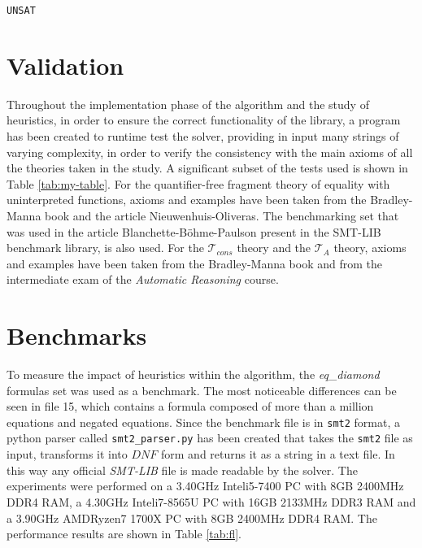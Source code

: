 \documentclass{IEEEtran}
\begin{document}
\begin{lstlisting}
UNSAT
\end{lstlisting}

\section{Validation}
Throughout the implementation phase of the algorithm and the study of heuristics, in order to ensure the correct functionality of the library, a program has been created to runtime test the solver, providing in input many strings of varying complexity, in order to verify the consistency with the main axioms of all the theories taken in the study. A significant subset of the tests used is shown in Table \ref{tab:my-table}. For the quantifier-free fragment theory of equality with uninterpreted functions, axioms and examples have been taken from the Bradley-Manna book\cite{10.5555/1324777} and the article Nieuwenhuis-Oliveras\cite{NIEUWENHUIS2007557}. The benchmarking set that was used in the article Blanchette-B\"{o}hme-Paulson\cite{Blanchette2013} present in the SMT-LIB benchmark library\cite{Z3}, is also used. For the $\mathcal{T}_{cons}$ theory and the $\mathcal{T}_{A}$ theory, axioms and examples have been taken from the Bradley-Manna book\cite{10.5555/1324777} and from the intermediate exam of the \textit{Automatic Reasoning} course. 

\section{Benchmarks}
To measure the impact of heuristics within the algorithm, the \textit{eq\_diamond}\cite{Z3} formulas set was used as a benchmark. The most noticeable differences can be seen in file 15, which contains a formula composed of more than a million equations and negated equations. Since the benchmark file is in \verb|smt2| format, a python parser called \verb|smt2_parser.py| has been created that takes the \verb|smt2| file as input, transforms it into $DNF$ form and returns it as a string in a text file. In this way any official \textit{SMT-LIB} file is made readable by the solver.  The experiments were performed on a 3.40GHz Intel\textregistered i5-7400 PC with 8GB 2400MHz DDR4 RAM, a 4.30GHz Intel\textregistered i7-8565U PC with 16GB 2133MHz DDR3 RAM and a 3.90GHz AMD\textregistered Ryzen7 1700X PC with 8GB 2400MHz DDR4 RAM. 
The performance results are shown in Table \ref{tab:fl}.
\end{document}
